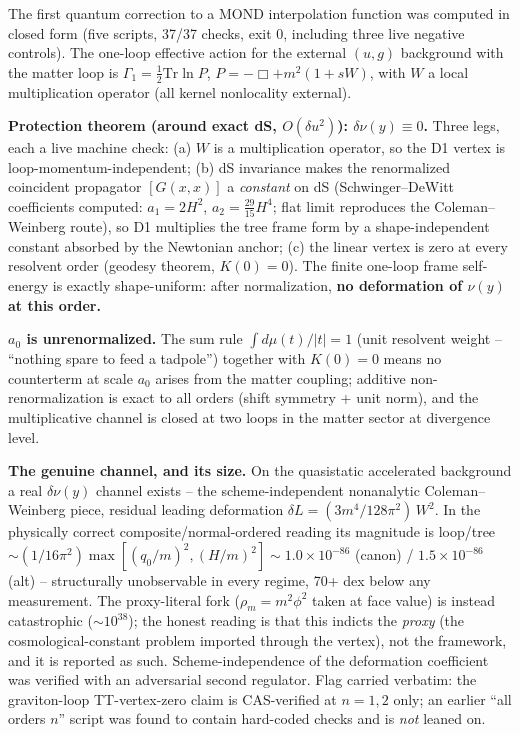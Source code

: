 \documentclass[
]{article}
\begin{document}
The first quantum correction to a MOND interpolation function was
computed in closed form (five scripts, 37/37 checks, exit 0, including
three live negative controls). The one-loop effective action for the
external \((u, g)\) background with the matter loop is
\(\Gamma_1 = \frac{1}{2}\mathrm{Tr}\ln P\), \(P = -\Box + m^2(1 + sW)\),
with \(W\) a local multiplication operator (all kernel nonlocality
external).

\textbf{Protection theorem (around exact dS, \(O(\delta u^2)\)):
\(\delta\nu(y) \equiv 0\).} Three legs, each a live machine check: (a)
\(W\) is a multiplication operator, so the D1 vertex is
loop-momentum-independent; (b) dS invariance makes the renormalized
coincident propagator \([G(x,x)]\) a \emph{constant} on dS
(Schwinger--DeWitt coefficients computed: \(a_1 = 2H^2\),
\(a_2 = \tfrac{29}{15}H^4\); flat limit reproduces the Coleman--Weinberg
route), so D1 multiplies the tree frame form by a shape-independent
constant absorbed by the Newtonian anchor; (c) the linear vertex is zero
at every resolvent order (geodesy theorem, \(K(0) = 0\)). The finite
one-loop frame self-energy is exactly shape-uniform: after
normalization, \textbf{no deformation of \(\nu(y)\) at this order.}

\textbf{\(a_0\) is unrenormalized.} The sum rule
\(\int d\mu(t)/|t| = 1\) (unit resolvent weight -- ``nothing spare to
feed a tadpole'') together with \(K(0) = 0\) means no counterterm at
scale \(a_0\) arises from the matter coupling; additive
non-renormalization is exact to all orders (shift symmetry + unit norm),
and the multiplicative channel is closed at two loops in the matter
sector at divergence level.

\textbf{The genuine channel, and its size.} On the quasistatic
accelerated background a real \(\delta\nu(y)\) channel exists -- the
scheme-independent nonanalytic Coleman--Weinberg piece, residual leading
deformation \(\delta L = (3 m^4/128\pi^2)\, W^2\). In the physically
correct composite/normal-ordered reading its magnitude is loop/tree
\(\sim (1/16\pi^2)\max[(q_0/m)^2, (H/m)^2] \sim 1.0 \times 10^{-86}\)
(canon) / \(1.5 \times 10^{-86}\) (alt) -- structurally unobservable in
every regime, 70+ dex below any measurement. The proxy-literal fork
(\(\rho_m = m^2\phi^2\) taken at face value) is instead catastrophic
(\(\sim 10^{38}\)); the honest reading is that this indicts the
\emph{proxy} (the cosmological-constant problem imported through the
vertex), not the framework, and it is reported as such.
Scheme-independence of the deformation coefficient was verified with an
adversarial second regulator. Flag carried verbatim: the graviton-loop
TT-vertex-zero claim is CAS-verified at \(n = 1, 2\) only; an earlier
``all orders \(n\)'' script was found to contain hard-coded checks and
is \emph{not} leaned on.
\end{document}
